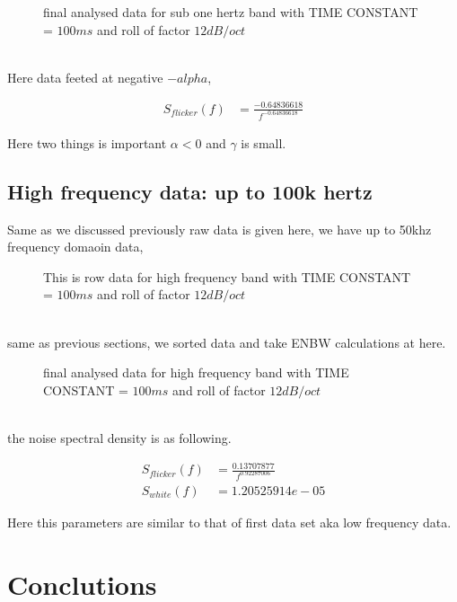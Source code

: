 \documentclass[12pt]{article}
\begin{document}
\begin{figure}[hbt!]
\caption{final analysed data for sub one hertz band with TIME CONSTANT = $100ms$ and roll of factor $12dB/oct$}
\end{figure}\\


Here data feeted at negative $-alpha$,

\begin{align}\label{eq2}
S_{flicker}(f) & =  \frac{-0.64836618}{f^{-0.64836618}}
\end{align}

Here two things is important $\alpha < 0$ and $\gamma$ is small.

\subsection{High frequency data: up to 100k hertz}

Same as we discussed previously raw data is given here, we have up to 50khz frequency domaoin data,


\begin{figure}[hbt!]
\caption{This is row data for high frequency band with TIME CONSTANT = $100ms$ and roll of factor $12dB/oct$} 
\label{raw100k}
\end{figure}\\

same as previous sections, we sorted data and take ENBW calculations at here.

\begin{figure}[hbt!]
\caption{final analysed data for high frequency band with TIME CONSTANT = $100ms$ and roll of factor $12dB/oct$}
\end{figure}\\

the noise spectral density is as following.

\begin{align}\label{eq3}
S_{flicker}(f) & = \frac{0.13707877}{f^{0.92287006}}\\
S_{white}(f) & = 1.20525914e-05
\end{align}


Here this parameters are similar to that of first data set aka low frequency data.

\clearpage
\section{Conclutions}
\end{document}

